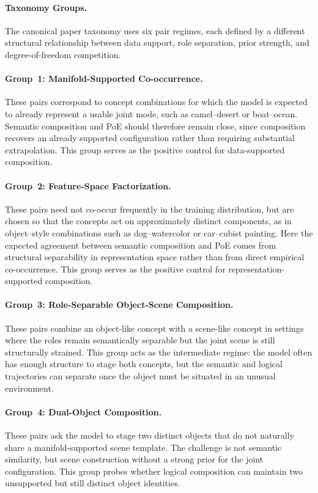 \documentclass{article}
\begin{document}
\paragraph{Taxonomy Groups.}
The canonical paper taxonomy uses six pair regimes, each defined by a different structural relationship between data support, role separation, prior strength, and degree-of-freedom competition.

\paragraph{Group~1: Manifold-Supported Co-occurrence.}
These pairs correspond to concept combinations for which the model is expected to already represent a usable joint mode, such as camel--desert or boat--ocean. Semantic composition and PoE should therefore remain close, since composition recovers an already supported configuration rather than requiring substantial extrapolation. This group serves as the positive control for data-supported composition.

\paragraph{Group~2: Feature-Space Factorization.}
These pairs need not co-occur frequently in the training distribution, but are chosen so that the concepts act on approximately distinct components, as in object--style combinations such as dog--watercolor or car--cubist painting. Here the expected agreement between semantic composition and PoE comes from structural separability in representation space rather than from direct empirical co-occurrence. This group serves as the positive control for representation-supported composition.

\paragraph{Group~3: Role-Separable Object-Scene Composition.}
These pairs combine an object-like concept with a scene-like concept in settings where the roles remain semantically separable but the joint scene is still structurally strained. This group acts as the intermediate regime: the model often has enough structure to stage both concepts, but the semantic and logical trajectories can separate once the object must be situated in an unusual environment.

\paragraph{Group~4: Dual-Object Composition.}
These pairs ask the model to stage two distinct objects that do not naturally share a manifold-supported scene template. The challenge is not semantic similarity, but scene construction without a strong prior for the joint configuration. This group probes whether logical composition can maintain two unsupported but still distinct object identities.
\end{document}
